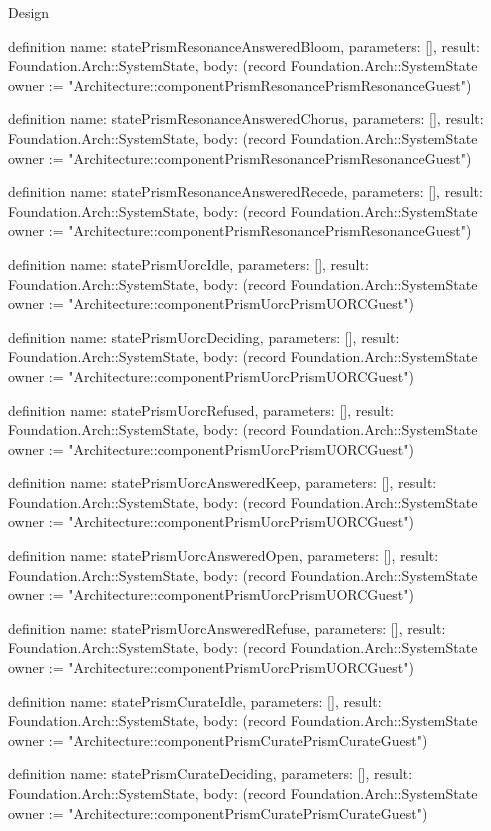 \begin{lexlean}{Design}
\begin{semanticmodule}
definition{
  name: statePrismResonanceAnsweredBloom,
  parameters: [],
  result: Foundation.Arch::SystemState,
  body: (record Foundation.Arch::SystemState {owner := "Architecture::componentPrismResonancePrismResonanceGuest"})
}

definition{
  name: statePrismResonanceAnsweredChorus,
  parameters: [],
  result: Foundation.Arch::SystemState,
  body: (record Foundation.Arch::SystemState {owner := "Architecture::componentPrismResonancePrismResonanceGuest"})
}

definition{
  name: statePrismResonanceAnsweredRecede,
  parameters: [],
  result: Foundation.Arch::SystemState,
  body: (record Foundation.Arch::SystemState {owner := "Architecture::componentPrismResonancePrismResonanceGuest"})
}

definition{
  name: statePrismUorcIdle,
  parameters: [],
  result: Foundation.Arch::SystemState,
  body: (record Foundation.Arch::SystemState {owner := "Architecture::componentPrismUorcPrismUORCGuest"})
}

definition{
  name: statePrismUorcDeciding,
  parameters: [],
  result: Foundation.Arch::SystemState,
  body: (record Foundation.Arch::SystemState {owner := "Architecture::componentPrismUorcPrismUORCGuest"})
}

definition{
  name: statePrismUorcRefused,
  parameters: [],
  result: Foundation.Arch::SystemState,
  body: (record Foundation.Arch::SystemState {owner := "Architecture::componentPrismUorcPrismUORCGuest"})
}

definition{
  name: statePrismUorcAnsweredKeep,
  parameters: [],
  result: Foundation.Arch::SystemState,
  body: (record Foundation.Arch::SystemState {owner := "Architecture::componentPrismUorcPrismUORCGuest"})
}

definition{
  name: statePrismUorcAnsweredOpen,
  parameters: [],
  result: Foundation.Arch::SystemState,
  body: (record Foundation.Arch::SystemState {owner := "Architecture::componentPrismUorcPrismUORCGuest"})
}

definition{
  name: statePrismUorcAnsweredRefuse,
  parameters: [],
  result: Foundation.Arch::SystemState,
  body: (record Foundation.Arch::SystemState {owner := "Architecture::componentPrismUorcPrismUORCGuest"})
}

definition{
  name: statePrismCurateIdle,
  parameters: [],
  result: Foundation.Arch::SystemState,
  body: (record Foundation.Arch::SystemState {owner := "Architecture::componentPrismCuratePrismCurateGuest"})
}

definition{
  name: statePrismCurateDeciding,
  parameters: [],
  result: Foundation.Arch::SystemState,
  body: (record Foundation.Arch::SystemState {owner := "Architecture::componentPrismCuratePrismCurateGuest"})
}


\end{semanticmodule}
\end{lexlean}
